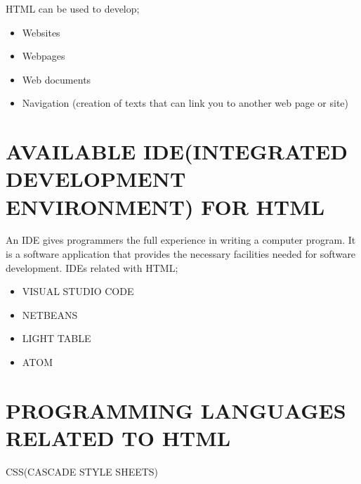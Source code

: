 \documentclass{article}
\begin{document}
	HTML can be used to develop;
	\begin{itemize}
		\item Websites
		\item Webpages
		\item Web documents
		\item Navigation (creation of texts that can link you to another web page or site)
	\end{itemize}
\section{AVAILABLE IDE(INTEGRATED DEVELOPMENT ENVIRONMENT) FOR HTML}
An IDE gives programmers the full experience in writing a computer program. It is a software application that provides the necessary facilities needed for software development.
IDEs related with HTML;
\begin{itemize}
	\item  VISUAL STUDIO CODE
	\item NETBEANS
	\item LIGHT TABLE
	\item ATOM
\end{itemize}
\section{PROGRAMMING LANGUAGES RELATED TO HTML}
CSS(CASCADE STYLE SHEETS)
\end{document}
